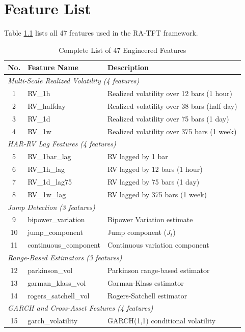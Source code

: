 \chapter{Feature List}
\label{AppendixA}

Table \ref{tab:features} lists all 47 features used in the RA-TFT framework.

\begin{table}[h!]
\caption{Complete List of 47 Engineered Features}
\label{tab:features}
\centering
\small
\begin{tabular}{clp{7cm}}
\hline
\textbf{No.} & \textbf{Feature Name} & \textbf{Description} \\
\hline
\multicolumn{3}{l}{\emph{Multi-Scale Realized Volatility (4 features)}} \\
1 & RV\_1h & Realized volatility over 12 bars (1 hour) \\
2 & RV\_halfday & Realized volatility over 38 bars (half day) \\
3 & RV\_1d & Realized volatility over 75 bars (1 day) \\
4 & RV\_1w & Realized volatility over 375 bars (1 week) \\
\hline
\multicolumn{3}{l}{\emph{HAR-RV Lag Features (4 features)}} \\
5 & RV\_1bar\_lag & RV lagged by 1 bar \\
6 & RV\_1h\_lag & RV lagged by 12 bars (1 hour) \\
7 & RV\_1d\_lag75 & RV lagged by 75 bars (1 day) \\
8 & RV\_1w\_lag & RV lagged by 375 bars (1 week) \\
\hline
\multicolumn{3}{l}{\emph{Jump Detection (3 features)}} \\
9 & bipower\_variation & Bipower Variation estimate \\
10 & jump\_component & Jump component ($J_t$) \\
11 & continuous\_component & Continuous variation component \\
\hline
\multicolumn{3}{l}{\emph{Range-Based Estimators (3 features)}} \\
12 & parkinson\_vol & Parkinson range-based estimator \\
13 & garman\_klass\_vol & Garman-Klass estimator \\
14 & rogers\_satchell\_vol & Rogers-Satchell estimator \\
\hline
\multicolumn{3}{l}{\emph{GARCH and Cross-Asset Features (4 features)}} \\
15 & garch\_volatility & GARCH(1,1) conditional volatility \\

\end{tabular}
\end{table}
